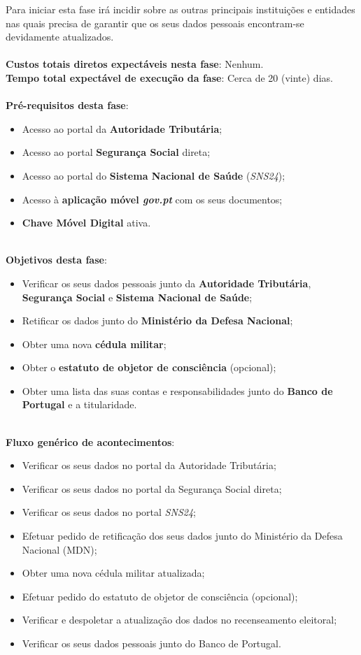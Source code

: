 Para iniciar esta fase irá incidir sobre as outras principais
instituições e entidades nas quais precisa de garantir que os seus dados
pessoais encontram-se devidamente atualizados. \\
\\
\textbf{Custos totais diretos expectáveis nesta fase}: Nenhum. \\
\textbf{Tempo total expectável de execução da fase}: Cerca de 20 (vinte)
dias. \\
\\
\textbf{Pré-requisitos desta fase}:
\begin{itemize}
	\item Acesso ao portal da \textbf{Autoridade Tributária};
	\item Acesso ao portal \textbf{Segurança Social} direta;
	\item Acesso ao portal do \textbf{Sistema Nacional de Saúde} (\emph{SNS24});
	\item Acesso à \textbf{aplicação móvel \emph{gov.pt}} com os seus documentos;
	\item \textbf{Chave Móvel Digital} ativa.
\end{itemize}
\leavevmode\\
\textbf{Objetivos desta fase}:
\begin{itemize}
	\item Verificar os seus dados pessoais junto da \textbf{Autoridade Tributária}, \textbf{Segurança Social} e \textbf{Sistema Nacional de Saúde};
	\item Retificar os dados junto do \textbf{Ministério da Defesa Nacional};
	\item Obter uma nova \textbf{cédula militar};
	\item Obter o \textbf{estatuto de objetor de consciência} (opcional);
	\item Obter uma lista das suas contas e responsabilidades junto do \textbf{Banco de Portugal} e a titularidade.
\end{itemize}
\leavevmode\\
\textbf{Fluxo genérico de acontecimentos}:
\begin{itemize}
	\item Verificar os seus dados no portal da Autoridade Tributária;
	\item Verificar os seus dados no portal da Segurança Social direta;
	\item Verificar os seus dados no portal \emph{SNS24};
	\item Efetuar pedido de retificação dos seus dados junto do Ministério da Defesa Nacional (MDN);
	\item Obter uma nova cédula militar atualizada;
	\item Efetuar pedido do estatuto de objetor de consciência (opcional);
	\item Verificar e despoletar a atualização dos dados no recenseamento eleitoral;
	\item Verificar os seus dados pessoais junto do Banco de Portugal.
\end{itemize}

